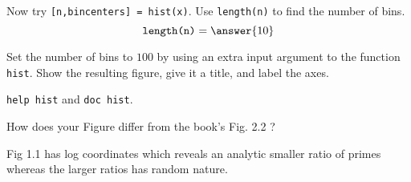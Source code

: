 \documentclass{ximera}
\begin{document}
\begin{problem}
    Now try \texttt{[n,bincenters] = hist(x)}. Use \texttt{length(n)} to find the number of bins.
\[
\texttt{length(n)}=\answer{10}
\]
\end{problem}

\begin{problem}
    Set the number of bins to $100$ by using an extra input argument to the function \texttt{hist}. Show the
resulting figure, give it a title, and label the axes. 
\begin{hint}
    \texttt{help hist} and \texttt{doc hist}.
\end{hint}
\end{problem}

\begin{problem}
    How does your Figure differ from the book’s Fig. 2.2 ?
    \begin{multipleChoice}
    \end{multipleChoice}

    \begin{feedback}[correct]
        Fig 1.1 has log coordinates which reveals an analytic smaller ratio of primes whereas the larger ratios has random nature.
    \end{feedback}
\end{problem}
\end{document}
